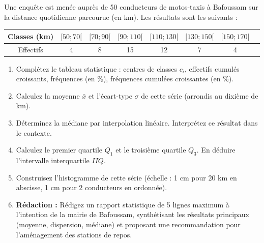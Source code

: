 \documentclass[11pt]{article}
\begin{document}
\begin{exercice}
Une enquête est menée auprès de 50 conducteurs de motos-taxis à Bafoussam sur la distance quotidienne parcourue (en km). Les résultats sont les suivants :

\begin{center}
\begin{tabular}{|c|c|c|c|c|c|c|c|}\hline
Classes (km) & $[50;70[$ & $[70;90[$ & $[90;110[$ & $[110;130[$ & $[130;150[$ & $[150;170[$ \\ \hline
Effectifs & 4 & 8 & 15 & 12 & 7 & 4 \\ \hline
\end{tabular}
\end{center}

\begin{enumerate}
    \item Complétez le tableau statistique : centres de classes $c_i$, effectifs cumulés croissants, fréquences (en \%), fréquences cumulées croissantes (en \%).
    \item Calculez la moyenne $\bar{x}$ et l'écart-type $\sigma$ de cette série (arrondis au dixième de km).
    \item Déterminez la médiane par interpolation linéaire. Interprétez ce résultat dans le contexte.
    \item Calculez le premier quartile $Q_1$ et le troisième quartile $Q_3$. En déduire l'intervalle interquartile $IIQ$.
    \item Construisez l'histogramme de cette série (échelle : 1 cm pour 20 km en abscisse, 1 cm pour 2 conducteurs en ordonnée).
    \item \textbf{Rédaction :} Rédigez un rapport statistique de 5 lignes maximum à l'intention de la mairie de Bafoussam, synthétisant les résultats principaux (moyenne, dispersion, médiane) et proposant une recommandation pour l'aménagement des stations de repos.
\end{enumerate}
\end{exercice}
\end{document}
